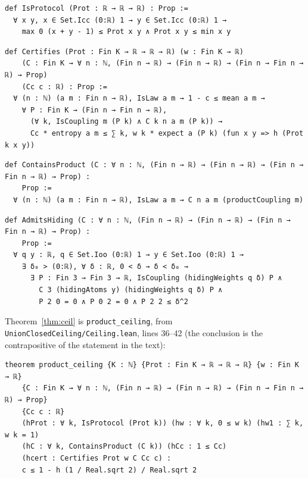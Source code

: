 \documentclass[11pt,a4paper]{article}
\theoremstyle{definition}
\theoremstyle{remark}
\begin{document}
\begin{Verbatim}[fontsize=\footnotesize,formatcom=\leanmono,samepage=false]
def IsProtocol (Prot : ℝ → ℝ → ℝ) : Prop :=
  ∀ x y, x ∈ Set.Icc (0:ℝ) 1 → y ∈ Set.Icc (0:ℝ) 1 →
    max 0 (x + y - 1) ≤ Prot x y ∧ Prot x y ≤ min x y
\end{Verbatim}
\begin{Verbatim}[fontsize=\footnotesize,formatcom=\leanmono,samepage=false]
def Certifies (Prot : Fin K → ℝ → ℝ → ℝ) (w : Fin K → ℝ)
    (C : Fin K → ∀ n : ℕ, (Fin n → ℝ) → (Fin n → ℝ) → (Fin n → Fin n → ℝ) → Prop)
    (Cc c : ℝ) : Prop :=
  ∀ (n : ℕ) (a m : Fin n → ℝ), IsLaw a m → 1 - c ≤ mean a m →
    ∀ P : Fin K → (Fin n → Fin n → ℝ),
      (∀ k, IsCoupling m (P k) ∧ C k n a m (P k)) →
      Cc * entropy a m ≤ ∑ k, w k * expect a (P k) (fun x y => h (Prot k x y))
\end{Verbatim}
\begin{Verbatim}[fontsize=\footnotesize,formatcom=\leanmono,samepage=false]
def ContainsProduct (C : ∀ n : ℕ, (Fin n → ℝ) → (Fin n → ℝ) → (Fin n → Fin n → ℝ) → Prop) :
    Prop :=
  ∀ (n : ℕ) (a m : Fin n → ℝ), IsLaw a m → C n a m (productCoupling m)
\end{Verbatim}
\begin{Verbatim}[fontsize=\footnotesize,formatcom=\leanmono,samepage=false]
def AdmitsHiding (C : ∀ n : ℕ, (Fin n → ℝ) → (Fin n → ℝ) → (Fin n → Fin n → ℝ) → Prop) :
    Prop :=
  ∀ q y : ℝ, q ∈ Set.Ioo (0:ℝ) 1 → y ∈ Set.Ioo (0:ℝ) 1 →
    ∃ δ₀ > (0:ℝ), ∀ δ : ℝ, 0 < δ → δ < δ₀ →
      ∃ P : Fin 3 → Fin 3 → ℝ, IsCoupling (hidingWeights q δ) P ∧
        C 3 (hidingAtoms y) (hidingWeights q δ) P ∧
        P 2 0 = 0 ∧ P 0 2 = 0 ∧ P 2 2 ≤ δ^2
\end{Verbatim}

Theorem~\ref{thm:ceil} is \texttt{product\_ceiling}, from
\texttt{UnionClosedCeiling/\allowbreak Ceiling.lean}, lines 36--42 (the conclusion is the
contrapositive of the statement in the text):

\begin{Verbatim}[fontsize=\footnotesize,formatcom=\leanmono,samepage=false]
theorem product_ceiling {K : ℕ} {Prot : Fin K → ℝ → ℝ → ℝ} {w : Fin K → ℝ}
    {C : Fin K → ∀ n : ℕ, (Fin n → ℝ) → (Fin n → ℝ) → (Fin n → Fin n → ℝ) → Prop}
    {Cc c : ℝ}
    (hProt : ∀ k, IsProtocol (Prot k)) (hw : ∀ k, 0 ≤ w k) (hw1 : ∑ k, w k = 1)
    (hC : ∀ k, ContainsProduct (C k)) (hCc : 1 ≤ Cc)
    (hcert : Certifies Prot w C Cc c) :
    c ≤ 1 - h (1 / Real.sqrt 2) / Real.sqrt 2
\end{Verbatim}
\end{document}
